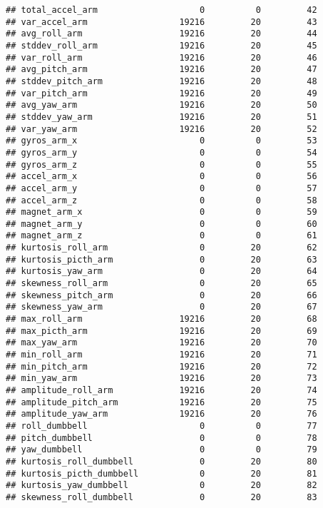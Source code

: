 \documentclass[]{article}
\begin{document}
\begin{verbatim}
## total_accel_arm                    0          0         42
## var_accel_arm                  19216         20         43
## avg_roll_arm                   19216         20         44
## stddev_roll_arm                19216         20         45
## var_roll_arm                   19216         20         46
## avg_pitch_arm                  19216         20         47
## stddev_pitch_arm               19216         20         48
## var_pitch_arm                  19216         20         49
## avg_yaw_arm                    19216         20         50
## stddev_yaw_arm                 19216         20         51
## var_yaw_arm                    19216         20         52
## gyros_arm_x                        0          0         53
## gyros_arm_y                        0          0         54
## gyros_arm_z                        0          0         55
## accel_arm_x                        0          0         56
## accel_arm_y                        0          0         57
## accel_arm_z                        0          0         58
## magnet_arm_x                       0          0         59
## magnet_arm_y                       0          0         60
## magnet_arm_z                       0          0         61
## kurtosis_roll_arm                  0         20         62
## kurtosis_picth_arm                 0         20         63
## kurtosis_yaw_arm                   0         20         64
## skewness_roll_arm                  0         20         65
## skewness_pitch_arm                 0         20         66
## skewness_yaw_arm                   0         20         67
## max_roll_arm                   19216         20         68
## max_picth_arm                  19216         20         69
## max_yaw_arm                    19216         20         70
## min_roll_arm                   19216         20         71
## min_pitch_arm                  19216         20         72
## min_yaw_arm                    19216         20         73
## amplitude_roll_arm             19216         20         74
## amplitude_pitch_arm            19216         20         75
## amplitude_yaw_arm              19216         20         76
## roll_dumbbell                      0          0         77
## pitch_dumbbell                     0          0         78
## yaw_dumbbell                       0          0         79
## kurtosis_roll_dumbbell             0         20         80
## kurtosis_picth_dumbbell            0         20         81
## kurtosis_yaw_dumbbell              0         20         82
## skewness_roll_dumbbell             0         20         83

\end{verbatim}
\end{document}
